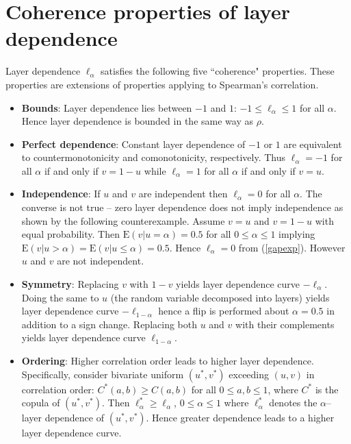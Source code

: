 \documentclass[authoryear]{elsarticle}
\newcommand{\E}{{\mathrm E}}
\newcommand{\eref}[1]{(\ref{#1})}
\begin{document}
\section{Coherence properties of layer dependence}\label{scoherence}


Layer dependence $\ell_\alpha$ satisfies the following five ``coherence" properties. These properties are extensions of properties applying to Spearman's correlation.
\begin{itemize}

\item \textbf{Bounds}: Layer dependence lies between $-1$ and $1$: $-1 \le\ell_\alpha \le 1$ for all $\alpha$.
Hence layer dependence is bounded in the same way as $\rho$.

\item \textbf{Perfect dependence}: Constant layer dependence of $-1$ or $1$ are equivalent to countermonotonicity and comonotonicity, respectively. Thus $\ell_\alpha=-1$ for all $\alpha$ if and only if  $v=1-u$ while $\ell_\alpha=1$ for all $\alpha$ if and only if  $v=u$.

\item \textbf{Independence}: If $u$ and $v$ are independent then $\ell_\alpha=0$ for all $\alpha$. The converse is not true -- zero layer dependence does not imply independence as shown by the following counterexample. Assume $v=u$ and $v=1-u$ with equal probability. Then $\E(v|u=\alpha)=0.5$ for all $0\leq \alpha\leq 1$ implying $\E(v|u>\alpha)=\E(v|u\leq\alpha)=0.5$. Hence $\ell_\alpha=0$ from \eref{gapexp}. However $u$ and $v$ are not independent.

\item \textbf{Symmetry}: Replacing $v$ with $1-v$ yields layer dependence curve $-\ell_\alpha$. Doing the same to $u$ (the random variable decomposed into layers) yields layer dependence curve $-\ell_{1-\alpha}$ hence a flip is performed about $\alpha=0.5$ in addition to a sign change. Replacing both $u$ and $v$ with their complements yields layer dependence curve $\ell_{1-\alpha}$.

\item \textbf{Ordering}: Higher correlation order \citep{dhaene2009correlation} leads to higher layer dependence. Specifically, consider bivariate uniform $(u^*,v^*)$ exceeding $(u,v)$ in correlation order: $C^*(a,b)\geq C(a,b)$ for all $0\leq a,b\leq 1$, where $C^*$ is the copula of $(u^*,v^*)$. Then
$\ell^*_\alpha \geq \ell_\alpha$,   $0\leq\alpha\leq 1$ where $\ell_\alpha^*$ denotes the $\alpha$--layer dependence of $(u^*,v^*)$. Hence greater dependence leads to a higher layer dependence curve.

\end{itemize}
\end{document}
